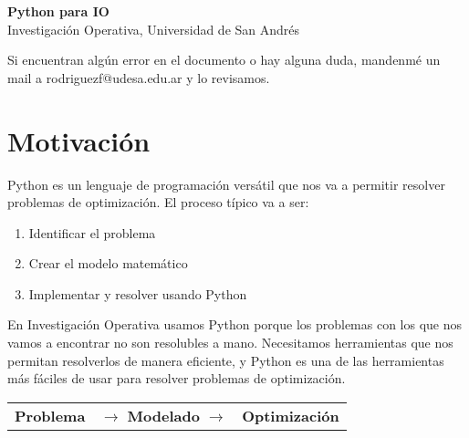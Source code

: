 \documentclass[12pt]{article}
\begin{document}
\begin{center}
  {\LARGE \textbf{Python para IO}}\\[0.5em]
  {Investigación Operativa, Universidad de San Andrés}
\end{center}

Si encuentran algún error en el documento o hay alguna duda, mandenmé un mail a rodriguezf@udesa.edu.ar y lo revisamos.

\section{Motivación}
Python es un lenguaje de programación versátil que nos va a permitir resolver problemas de optimización. El proceso típico va a ser:
\begin{enumerate}
    \item Identificar el problema
    \item Crear el modelo matemático
    \item Implementar y resolver usando Python
\end{enumerate}

En Investigación Operativa usamos Python porque los problemas con los que nos vamos a encontrar no son resolubles a mano. Necesitamos herramientas que nos permitan resolverlos de manera eficiente, y Python es una de las herramientas más fáciles de usar para resolver problemas de optimización.

\vspace{0.5cm}
\begin{tabular}{ccc}
    \textbf{Problema} & \hspace{0.8cm} $\rightarrow$ \hspace{0.8cm} \textbf{Modelado} \hspace{0.8cm} $\rightarrow$ \hspace{0.8cm} & \textbf{Optimización}
\end{tabular}
\end{document}
